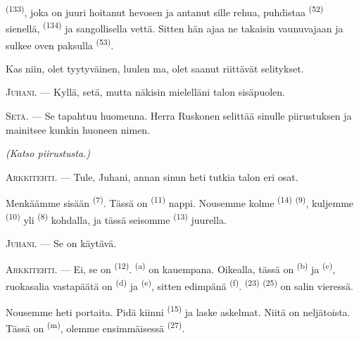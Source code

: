  \textsuperscript{(133)}, joka on juuri hoitanut hevosen ja
antanut sille rehua, puhdistaa  \textsuperscript{(52)} sienellä,
 \textsuperscript{(134)} ja sangollisella vettä. Sitten hän
ajaa ne takaisin vaunuvajaan ja sulkee oven paksulla 
\textsuperscript{(53)}.

Kas niin, olet tyytyväinen, luulen ma, olet saanut riittävät selitykset.

\textsc{Juhani}. --- Kyllä, setä, mutta näkisin mielelläni talon sisäpuolen.

\textsc{Setä}. --- Se tapahtuu huomenna. Herra Ruskonen selittää sinulle
piirustuksen ja mainitsee kunkin huoneen nimen.

\VUsaut{3.0mm}
\VUsaut{2.4mm}

{\centering\textit{(Katso piirustusta.)}\par}
\VUsaut{2.4mm}

\textsc{Arkkitehti}. --- Tule, Juhani, annan sinun heti tutkia talon eri osat.

Menkäämme sisään  \textsuperscript{(7)}. Tässä on
 \textsuperscript{(11)} nappi. Nousemme kolme
 \textsuperscript{(14)} 
\textsuperscript{(9)}, kuljemme  \textsuperscript{(10)} yli
 \textsuperscript{(8)} kohdalla, ja tässä seisomme
 \textsuperscript{(13)} juurella.

\textsc{Juhani}. --- Se on käytävä.

\textsc{Arkkitehti}. --- Ei, se on  \textsuperscript{(12)}.
 \textsuperscript{(a)} on kauempana. Oikealla, tässä on
 \textsuperscript{(b)} ja 
\textsuperscript{(c)}, ruokasalia vastapäätä on 
\textsuperscript{(d)} ja  \textsuperscript{(e)}, sitten
edimpänä  \textsuperscript{(f)}. 
\textsuperscript{(23)}  \textsuperscript{(25)} on salin
vieressä.

Nousemme heti portaita. Pidä kiinni 
\textsuperscript{(15)} ja laske askelmat. Niitä on neljätoista. Tässä on
 \textsuperscript{(m)}, olemme ensimmäisessä
 \textsuperscript{(27)}.

